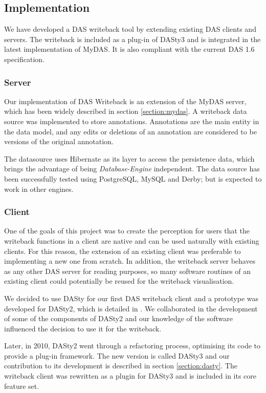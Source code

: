 \subsection{Implementation}
We have developed a DAS writeback tool by extending existing DAS clients and servers. The writeback is included as a plug-in of DASty3 and is integrated in the latest implementation of MyDAS. It is also compliant with the current DAS 1.6 specification. 

\subsubsection{Server}
Our implementation of DAS Writeback is an extension of the MyDAS server, which has been widely described in section \ref{section:mydas}. A writeback data source was implemented to store annotations. Annotations are the main entity in the data model, and any edits or deletions of an annotation are considered to be versions of the original annotation.

The datasource uses Hibernate \cite{BAU2006} as its layer to access the persistence data, which brings the advantage of being \emph{Database-Engine} independent. The data source has been successfully tested using PostgreSQL, MySQL and Derby; but is expected to work in other engines.

\subsubsection{Client}\label{section:dastywb}
One of the goals of this project was to create the perception for users that the writeback functions in a client are native and can be used naturally with existing clients. For this reason, the extension of an existing client was preferable to implementing a new one from scratch. In addition, the writeback server behaves as any other DAS server for reading purposes, so many software routines of an existing client could potentially be reused for the writeback visualisation.

We decided to use DASty for our first DAS writeback client and a prototype was developed for DASty2, which is detailed in \cite{SAL2010}. We collaborated in the development of some of the components of DASty2 \cite{JIM2008} and our knowledge of the software influenced the decision to use it for the writeback.

Later, in 2010, DASty2 went through a refactoring process, optimising its code to provide a plug-in framework. The new version is called DASty3 and our contribution to its development is described in section \ref{section:dasty}. The writeback client was rewritten as a plugin for DASty3 and is included in its core feature set.


